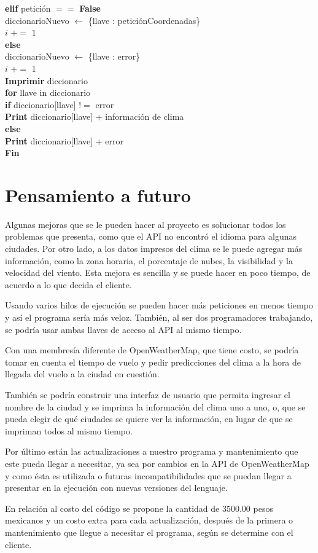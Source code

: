 \documentclass[]{article}
\begin{document}
\indent\indent\indent \textbf{elif} petición $ == $ \textbf{False}\\
\indent\indent\indent\indent diccionarioNuevo $ \leftarrow $ \{llave : 
peticiónCoordenadas\}\\
\indent\indent\indent\indent $ i $ $ += $ $ 1 $\\
\indent\indent\indent \textbf{else}\\
\indent\indent\indent\indent diccionarioNuevo $ \leftarrow $ \{llave : error\}
\\
\indent\indent\indent\indent $ i $ $ += $ $ 1 $\\
\indent\textbf{Imprimir} diccionario\\
\indent\indent \textbf{for} llave in diccionario\\
\indent\indent\indent \textbf{if} diccionario[llave] $ != $ error\\
\indent\indent\indent\indent \textbf{Print} diccionario[llave] + información 
de clima\\
\indent\indent\indent \textbf{else}\\
\indent\indent\indent\indent \textbf{Print} diccionario[llave] + error\\
\textbf{Fin}

\section{Pensamiento a futuro}
Algunas mejoras que se le pueden hacer al proyecto es solucionar todos los 
problemas que presenta, como que el API no encontró el idioma para algunas 
ciudades. Por otro lado, a los datos impresos del clima se le puede agregar 
más información, como la zona horaria, el porcentaje de nubes, la visibilidad 
y la velocidad del viento. Esta mejora es sencilla y se puede hacer en poco 
tiempo, de acuerdo a lo que decida el cliente.

Usando varios hilos de ejecución se pueden hacer más peticiones en menos 
tiempo y así el programa sería más veloz. También, al ser dos 
programadores trabajando, se podría usar ambas llaves de acceso al API al 
mismo tiempo.

Con una membresía diferente de OpenWeatherMap, que tiene costo, se 
podría tomar en cuenta el tiempo de vuelo y pedir predicciones del clima a la 
hora de llegada del vuelo a la ciudad en cuestión.

También se podría construir una interfaz de usuario que permita ingresar 
el nombre de la ciudad y se imprima la información del clima uno a uno, o, 
que se pueda elegir de qué ciudades se quiere ver la información, en lugar de 
que se impriman todos al mismo tiempo.

Por último están las actualizaciones a nuestro programa y mantenimiento 
que este pueda llegar a necesitar, ya sea por cambios en la API de 
OpenWeatherMap y como ésta es utilizada o futuras incompatibilidades que 
se puedan llegar a presentar en la ejecución con nuevas versiones del 
lenguaje.

En relación al costo del código se propone la cantidad de $ 3500.00 $ pesos 
mexicanos y un costo extra para cada actualización, después de la primera o 
mantenimiento que llegue a necesitar el programa, según se determine con 
el cliente.
\end{document}
